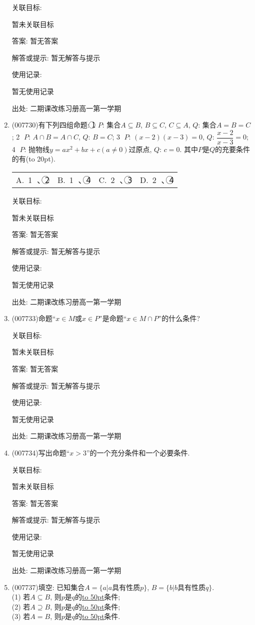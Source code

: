 \documentclass[10pt,a4paper]{article}
\newcommand{\blank}[1]{\underline{\hbox to #1pt{}}}
\newcommand{\bracket}[1]{(\hbox to #1pt{})}
\newcommand{\fourch}[4]{\par\begin{tabular}{p{.23\textwidth}p{.23\textwidth}p{.23\textwidth}p{.23\textwidth}}
A.~#1 &B.~#2& C.~#3& D.~#4
\end{tabular}}
\begin{document}
\begin{enumerate}[1.]
关联目标:

暂未关联目标

答案: 暂无答案

解答或提示: 暂无解答与提示

使用记录:

暂无使用记录


出处: 二期课改练习册高一第一学期
\item { (007730)}有下列四组命题:
\textcircled{1} $P$: 集合$A\subseteq B$, $B\subseteq C$, $C\subseteq A$, 		$Q$: 集合$A=B=C$;
\textcircled{2} $P$: $A\cap B=A\cap C$, 					$Q$: $B=C$;
\textcircled{3} $P$: $(x-2)(x-3)=0$, 				$Q$: $\dfrac{x-2}{x-3}=0$;
\textcircled{4} $P$: 抛物线$y=ax^2+bx+c(a\ne 0)$过原点, $Q$: $c=0$.
其中$P$是$Q$的充要条件的有\bracket{20}.
\fourch{\textcircled{1} 、\textcircled{2} }{\textcircled{1} 、\textcircled{4} }{\textcircled{2} 、\textcircled{3} }{\textcircled{2} 、\textcircled{4}}


关联目标:

暂未关联目标

答案: 暂无答案

解答或提示: 暂无解答与提示

使用记录:

暂无使用记录


出处: 二期课改练习册高一第一学期
\item { (007733)}命题``$x\in M$或$x\in P$''是命题``$x\in M\cap P$''的什么条件?


关联目标:

暂未关联目标

答案: 暂无答案

解答或提示: 暂无解答与提示

使用记录:

暂无使用记录


出处: 二期课改练习册高一第一学期
\item { (007734)}写出命题``$x>3$''的一个充分条件和一个必要条件.


关联目标:

暂未关联目标

答案: 暂无答案

解答或提示: 暂无解答与提示

使用记录:

暂无使用记录


出处: 二期课改练习册高一第一学期
\item { (007737)}填空:
已知集合$A=\{a|a$具有性质$p\}$, $B=\{b|b$具有性质$q\}$.\\
(1) 若$A\subseteq B$, 则$p$是$q$的\blank{50}条件;\\
(2) 若$A\supseteq B$, 则$p$是$q$的\blank{50}条件;\\
(3) 若$A=B$, 则$p$是$q$的\blank{50}条件.



\end{enumerate}
\end{document}
